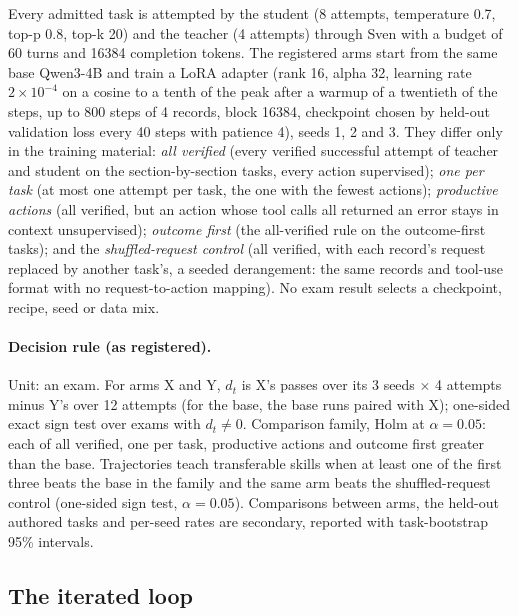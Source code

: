Every admitted task is attempted by the student (8 attempts, temperature 0.7, top-p 0.8, top-k 20) and the teacher (4
attempts) through Sven with a budget of 60 turns and 16384 completion tokens. The registered arms
start from the same base Qwen3-4B and train a LoRA adapter (rank 16, alpha 32, learning rate $2\times10^{-4}$ on a cosine to a tenth of the peak after a warmup of a twentieth of the steps, up to 800 steps
of 4 records, block 16384, checkpoint chosen by held-out validation loss every 40 steps with patience 4), seeds 1, 2 and 3. They
differ only in the training material: \emph{all verified} (every verified successful attempt of teacher and student on the
section-by-section tasks, every action supervised); \emph{one per task} (at most one attempt per task, the one with the fewest
actions); \emph{productive actions} (all verified, but an action whose tool calls all returned an error stays in context
unsupervised); \emph{outcome first} (the all-verified rule on the outcome-first tasks); and the \emph{shuffled-request
control} (all verified, with each record's request replaced by another task's, a seeded derangement: the same records and
tool-use format with no request-to-action mapping). No exam result selects a checkpoint, recipe, seed or data mix.

\paragraph{Decision rule (as registered).} Unit: an exam. For arms X and Y, $d_t$ is X's passes over its 3 seeds $\times$ 4
attempts minus Y's over 12 attempts (for the base, the base runs paired with X); one-sided exact sign test over exams with
$d_t\neq0$. Comparison family, Holm at $\alpha=0.05$: each of all verified, one per task, productive actions and outcome first
greater than the base. Trajectories teach transferable skills when at least one of the first three beats the base in the family
and the same arm beats the shuffled-request control (one-sided sign test, $\alpha=0.05$). Comparisons between arms, the
held-out authored tasks and per-seed rates are secondary, reported with task-bootstrap 95\% intervals.

\subsection{The iterated loop}\label{sec:m-loop}

